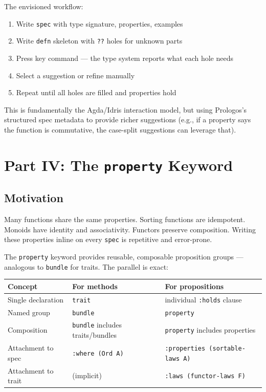 \documentclass[11pt]{article}
\begin{document}
The envisioned workflow:

\begin{enumerate}
\item Write \texttt{spec} with type signature, properties, examples
\item Write \texttt{defn} skeleton with \texttt{??} holes for unknown parts
\item Press key command --- the type system reports what each hole needs
\item Select a suggestion or refine manually
\item Repeat until all holes are filled and properties hold
\end{enumerate}

This is fundamentally the Agda/Idris interaction model, but using Prologos's
structured spec metadata to provide richer suggestions (e.g., if a property says
the function is commutative, the case-split suggestions can leverage that).
\section{Part IV: The \texttt{property} Keyword}
\label{sec:org0e1a952}

\subsection{Motivation}
\label{sec:org4772d74}

Many functions share the same properties. Sorting functions are idempotent.
Monoids have identity and associativity. Functors preserve composition. Writing
these properties inline on every \texttt{spec} is repetitive and error-prone.

The \texttt{property} keyword provides reusable, composable proposition groups ---
analogous to \texttt{bundle} for traits. The parallel is exact:

\begin{center}
\begin{tabular}{lll}
Concept & For methods & For propositions\\
\hline
Single declaration & \texttt{trait} & individual \texttt{:holds} clause\\
Named group & \texttt{bundle} & \texttt{property}\\
Composition & \texttt{bundle} includes traits/bundles & \texttt{property} includes properties\\
Attachment to spec & \texttt{:where (Ord A)} & \texttt{:properties (sortable-laws A)}\\
Attachment to trait & (implicit) & \texttt{:laws (functor-laws F)}\\
\end{tabular}
\end{center}
\end{document}

